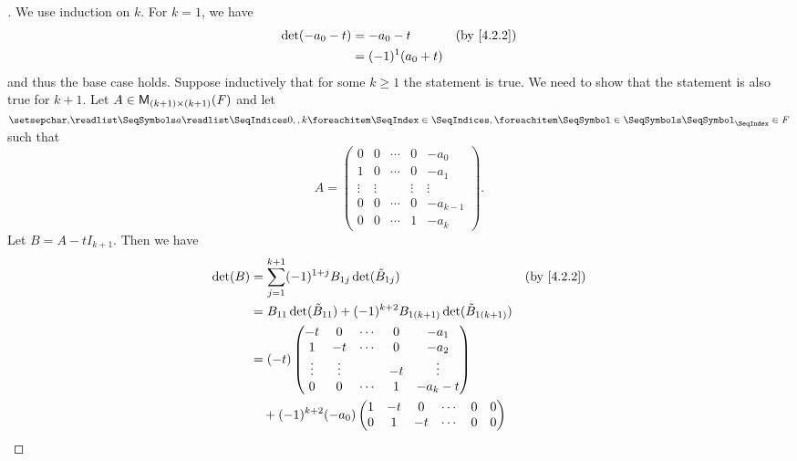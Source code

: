 \begin{proof}[]
  We use induction on \(k\).
  For \(k = 1\), we have
  \begin{align*}
    \det(-a_0 - t) & = -a_0 - t         &  & \text{(by \cref{4.2.2})} \\
                   & = (-1)^1 (a_0 + t)
  \end{align*}
  and thus the base case holds.
  Suppose inductively that for some \(k \geq 1\) the statement is true.
  We need to show that the statement is also true for \(k + 1\).
  Let \(A \in \mathsf{M}_{{(k + 1)} \times (k + 1)}({\mathit{F}})\) and let \(\seq{a}{0,,k} \in \F\) such that
  \[
    A = \begin{pmatrix}
      0      & 0      & \cdots & 0      & -a_0       \\
      1      & 0      & \cdots & 0      & -a_1       \\
      \vdots & \vdots &        & \vdots & \vdots     \\
      0      & 0      & \cdots & 0      & -a_{k - 1} \\
      0      & 0      & \cdots & 1      & -a_k
    \end{pmatrix}.
  \]
  Let \(B = A - t I_{k + 1}\).
  Then we have
  \begin{align*}
    \det(B) & = \sum_{j = 1}^{k + 1} (-1)^{1 + j} B_{1 j} \det(\tilde{B}_{1 j})                        &  & \text{(by \cref{4.2.2})}         \\
            & = B_{1 1} \det(\tilde{B}_{1 1}) + (-1)^{k + 2} B_{1 (k + 1)} \det(\tilde{B}_{1 (k + 1)})                                       \\
            & = (-t) \begin{pmatrix}
                       -t     & 0      & \cdots & 0  & -a_1     \\
                       1      & -t     & \cdots & 0  & -a_2     \\
                       \vdots & \vdots &        & -t & \vdots   \\
                       0      & 0      & \cdots & 1  & -a_k - t
                     \end{pmatrix}                                                                                \\
            & \quad + (-1)^{k + 2} (-a_0) \begin{pmatrix}
                                            1      & -t     & 0      & \cdots & 0      & 0      \\
                                            0      & 1      & -t     & \cdots & 0      & 0      \\

\end{pmatrix}
\end{align*}
\end{proof}
